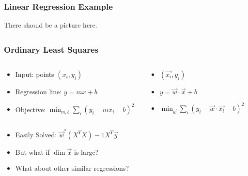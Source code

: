 
\newcommand\here{lalala}
\newcommand\dis{\displaystyle }


\subsection{}
\begin{frame}
  \frametitle{Linear Regression Example}
  There should be a picture here.

\end{frame}


\subsection{}
\begin{frame}
\frametitle{Ordinary Least Squares}

\begin{columns}
  \begin{column}{0.6\textwidth}
    \begin{itemize}
    \item[] Input: points $(x_i, y_i)$
      \item[] Regression line: $y = mx + b$
\item[] Objective: $\displaystyle \min_{m, b} \sum_{i}(y_i - mx_i -b)^2$
    \end{itemize}
  \end{column}

  \begin{column}{0.5\textwidth}
    \begin{itemize}
    \item[] $(\vec{x_i}, y_i)$
    \item[] $y = \vec{w} \cdot \vec{x} + b$
    \item[] $\dis \min_{\vec{w}}\sum_{i}(y_i - \vec{w} \cdot \vec{x_i} -b)^2$
    \end{itemize}

  \end{column}
\end{columns}

\begin{itemize}
\item Easily Solved: $\vec{w}^*(X^TX)-1X^T\vec{y}$
\item But what if $\dim\vec{x} $ is large?
\item What about other similar regressions?
\end{itemize}

\end{frame}

